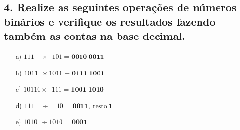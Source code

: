 \documentclass[a4paper, 12pt]{article}
\begin{document}
\subsection*{4. Realize as seguintes operações de números binários e verifique os resultados fazendo também as contas na base decimal.}

\begin{enumerate}
    \item[a)] \(111\phantom{10} \times \phantom{1}101 = \mathbf{0010\ 0011}\)
    \item[b)] \(1011\phantom{0} \times           1011 = \mathbf{0111\ 1001}\)
    \item[c)] \(10110           \times \phantom{1}111 = \mathbf{1001\ 1010}\)
    \item[d)] \(111\phantom{10} \div   \phantom{11}10 = \mathbf{0011},\ \text{resto}\ \mathbf{1}\)
    \item[e)] \(1010\phantom{1} \div             1010 = \mathbf{0001}\)
\end{enumerate}
\end{document}
